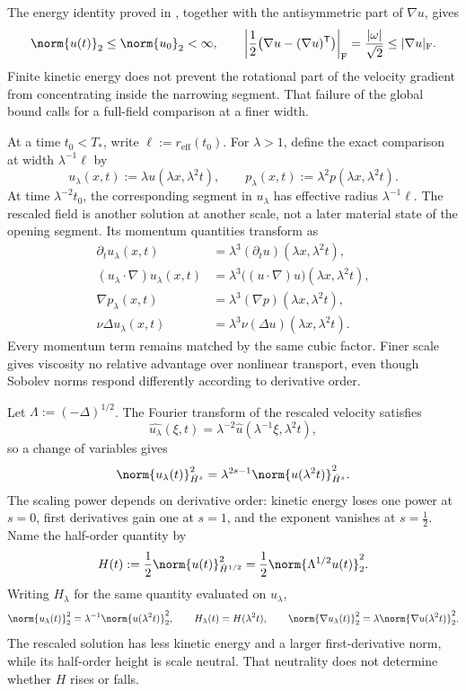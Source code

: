 The energy identity proved in , together with the antisymmetric part of \(\nabla u\), gives
\[
  \norm{u(t)}_2
  \leq
  \norm{u_0}_2
  <\infty,
  \qquad
  \left|\frac12\bigl(\nabla u-(\nabla u)^{\mathsf T}\bigr)\right|_{\mathrm F}
  =
  \frac{|\omega|}{\sqrt2}
  \leq
  |\nabla u|_{\mathrm F}.
\]
Finite kinetic energy does not prevent the rotational part of the velocity gradient from concentrating inside the narrowing segment. That failure of the global bound calls for a full-field comparison at a finer width.


At a time \(t_0<T_*\), write \(\ell:=r_{\mathrm{eff}}(t_0)\). For \(\lambda>1\), define the exact \NavierStokes{} comparison at width \(\lambda^{-1}\ell\) by
\[
  u_\lambda(x,t)
  :=
  \lambda u(\lambda x,\lambda^2t),
  \qquad
  p_\lambda(x,t)
  :=
  \lambda^2p(\lambda x,\lambda^2t).
\]
At time \(\lambda^{-2}t_0\), the corresponding segment in \(u_\lambda\) has effective radius \(\lambda^{-1}\ell\). The rescaled field is another solution at another scale, not a later material state of the opening segment. Its momentum quantities transform as
\[
\begin{aligned}
  \partial_tu_\lambda(x,t)
  &=
  \lambda^3(\partial_tu)(\lambda x,\lambda^2t),
  \\
  (u_\lambda\cdot\nabla)u_\lambda(x,t)
  &=
  \lambda^3\bigl((u\cdot\nabla)u\bigr)(\lambda x,\lambda^2t),
  \\
  \nabla p_\lambda(x,t)
  &=
  \lambda^3(\nabla p)(\lambda x,\lambda^2t),
  \\
  \nu\Delta u_\lambda(x,t)
  &=
  \lambda^3\nu(\Delta u)(\lambda x,\lambda^2t).
\end{aligned}
\]
Every momentum term remains matched by the same cubic factor. Finer scale gives viscosity no relative advantage over nonlinear transport, even though Sobolev norms respond differently according to derivative order.


Let \(\Lambda:=(-\Delta)^{1/2}\). The Fourier transform of the rescaled velocity satisfies
\[
  \widehat{u_\lambda}(\xi,t)
  =
  \lambda^{-2}\widehat u(\lambda^{-1}\xi,\lambda^2t),
\]
so a change of variables gives
\[
  \norm{u_\lambda(t)}_{\dot H^s}^2
  =
  \lambda^{2s-1}
  \norm{u(\lambda^2t)}_{\dot H^s}^2.
\]
The scaling power depends on derivative order: kinetic energy loses one power at \(s=0\), first derivatives gain one at \(s=1\), and the exponent vanishes at \(s=\tfrac12\). Name the half-order quantity by
\[
  H(t)
  :=
  \frac12\norm{u(t)}_{\dot H^{1/2}}^2
  =
  \frac12\norm{\Lambda^{1/2}u(t)}_2^2.
\]
Writing \(H_\lambda\) for the same quantity evaluated on \(u_\lambda\),
\[
  \norm{u_\lambda(t)}_2^2
  =
  \lambda^{-1}\norm{u(\lambda^2t)}_2^2,
  \qquad
  H_\lambda(t)=H(\lambda^2t),
  \qquad
  \norm{\nabla u_\lambda(t)}_2^2
  =
  \lambda\norm{\nabla u(\lambda^2t)}_2^2.
\]
The rescaled solution has less kinetic energy and a larger first-derivative norm, while its half-order height is scale neutral. That neutrality does not determine whether \(H\) rises or falls.

